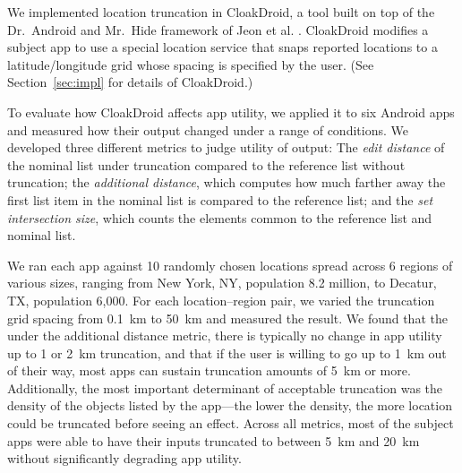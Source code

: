 \documentclass[10pt, conference, compsocconf]{IEEEtran}
\newcommand{\fuzzer}{CloakDroid\xspace}
\newcommand{\numpointspercity}{10\xspace}
\newcommand{\numcities}{6\xspace}
\begin{document}
We implemented location truncation in \fuzzer{}, a tool built on top
of the Dr.~Android and Mr.~Hide framework of Jeon et al.
\cite{jsjeon:spsm12}. \fuzzer{} modifies a subject app to use a special
location service that snaps reported locations to a latitude/longitude
grid whose spacing is specified by the user.  (See
Section~\ref{sec:impl} for details of \fuzzer{}.)

To evaluate how \fuzzer{} affects app utility, we applied it to six
Android apps and measured how their output changed under a range of
conditions. 
We developed three different metrics to judge utility of output:
The \emph{edit distance} of the nominal list under truncation compared to 
the reference list without truncation; the \emph{additional distance}, 
which computes how much farther away the first list item in the
nominal list is compared to the reference list;
and the \emph{set intersection size}, which counts the 
elements common to the reference list and nominal list.


We ran each app against \numpointspercity randomly chosen locations
spread
across \numcities regions of various sizes, ranging from New York, NY,
population 8.2 million, to Decatur, TX, population 6,000. For each
location--region pair, we varied the truncation grid spacing from 0.1~km
to 50~km and measured the result. We found that the under the
additional distance metric, there is typically no change in app
utility up to 1 or 2~km truncation, and that if the user is willing to
go up to 1~km out of their way, most apps can sustain truncation
amounts of 5~km or more. Additionally, the most important determinant of acceptable
truncation was the density of the objects listed by the app---the
lower the density, the more location could be truncated before seeing
an effect.   Across all metrics, most of the subject apps were able to 
have their inputs truncated to between 5~km and 20~km without
significantly degrading app utility.
\end{document}
